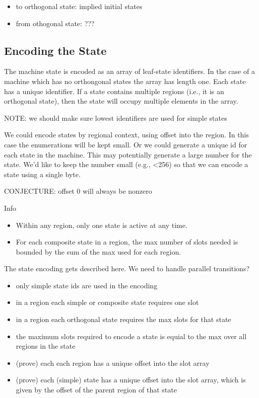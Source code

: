 \documentclass{article}
\begin{document}
\begin{itemize}
\item to orthogonal state: implied initial states
\item from othogonal state: ???
\end{itemize}


\subsection{Encoding the State}

The machine state is encoded as an array of leaf-state identifiers.
In the case of a machine which has no orthongonal states the array has
length one.  Each state has a unique identifier.  If a state contains
multiple regions (i.e., it is an orthogonal state), then the state
will occupy multiple elements in the array.

NOTE: we should make sure lowest identifiers are used for simple states

We could encode states by regional context, using offset into the region. 
In this case the enumerations will be kept small.  Or we could generate a 
unique id for each state in the machine.  This may potentially generate
a large number for the state.  We'd like to keep the number small (e.g., <256)
so that we can encode a state using a single byte.

CONJECTURE: offset 0 will always be nonzero

Info
\begin{itemize}
\item Within any region, only one state is active at any time.
\item For each composite state in a region, the max number of slots
  needed is bounded by the sum of the max used for each region.
\end{itemize}

The state encoding gets described here.  We need to handle parallel transitions?
\begin{itemize}
\item only simple state ids are used in the encoding
\item in a region each simple or composite state requires one slot
\item in a region each orthogonal state requires the max slots for that state
\item the maximum slots required to encode a state is equial to the max over
all regions in the state
\item (prove) each each region has a unique offset into the slot array
\item (prove) each (simple) state has a unique offset into the slot
  array, which is given by the offset of the parent region of that state
\end{itemize}
\end{document}
